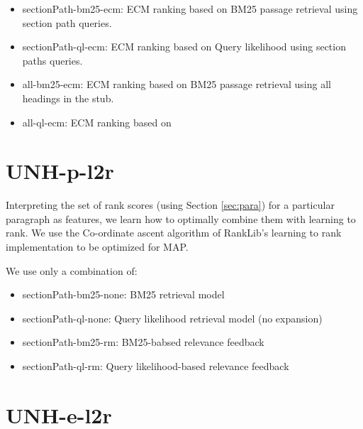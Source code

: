 \documentclass{article}
\begin{document}
\begin{itemize}
\item sectionPath-bm25-ecm: ECM ranking based on BM25 passage retrieval using section path queries.
\item sectionPath-ql-ecm: ECM ranking based on Query likelihood using section paths queries.
\item all-bm25-ecm: ECM ranking based on BM25 passage retrieval using all headings in the stub.
\item all-ql-ecm: ECM ranking based on 

    \end{itemize}


\section{UNH-p-l2r}

Interpreting the set of rank scores (using Section \ref{sec:para}) for a particular paragraph as features, we learn how to optimally combine them with learning to rank. We use the Co-ordinate ascent algorithm of RankLib's learning to rank implementation to be optimized for MAP.

We use only a combination of:
\begin{itemize}
    \item sectionPath-bm25-none: BM25 retrieval model
    \item sectionPath-ql-none: Query likelihood retrieval model (no expansion)
    \item sectionPath-bm25-rm: BM25-babsed relevance feedback
    \item sectionPath-ql-rm: Query likelihood-based relevance feedback
\end{itemize}



\section{UNH-e-l2r}
\end{document}
